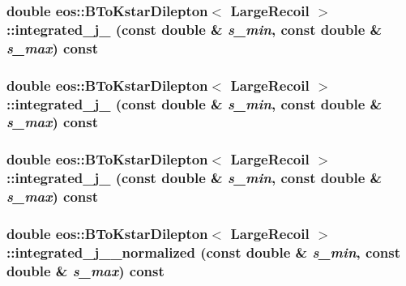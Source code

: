 \hypertarget{classeos_1_1BToKstarDilepton_3_01LargeRecoil_01_4_a1359d703e7bb13a8baea5500e955b8fd}{
\subsubsection[{integrated\_\-j\_\-7}]{\setlength{\rightskip}{0pt plus 5cm}double eos::BToKstarDilepton$<$ {\bf LargeRecoil} $>$::integrated\_\-j\_ (const double \& {\em s\_\-min}, \/  const double \& {\em s\_\-max}) const}}
\label{classeos_1_1BToKstarDilepton_3_01LargeRecoil_01_4_a1359d703e7bb13a8baea5500e955b8fd}
\hypertarget{classeos_1_1BToKstarDilepton_3_01LargeRecoil_01_4_af9105f4298f556dd4a9f449a820dcdd1}{
\subsubsection[{integrated\_\-j\_\-8}]{\setlength{\rightskip}{0pt plus 5cm}double eos::BToKstarDilepton$<$ {\bf LargeRecoil} $>$::integrated\_\-j\_ (const double \& {\em s\_\-min}, \/  const double \& {\em s\_\-max}) const}}
\label{classeos_1_1BToKstarDilepton_3_01LargeRecoil_01_4_af9105f4298f556dd4a9f449a820dcdd1}
\hypertarget{classeos_1_1BToKstarDilepton_3_01LargeRecoil_01_4_afd16f06bd47dcc25e9b63c55f54c8ea6}{
\subsubsection[{integrated\_\-j\_\-9}]{\setlength{\rightskip}{0pt plus 5cm}double eos::BToKstarDilepton$<$ {\bf LargeRecoil} $>$::integrated\_\-j\_ (const double \& {\em s\_\-min}, \/  const double \& {\em s\_\-max}) const}}
\label{classeos_1_1BToKstarDilepton_3_01LargeRecoil_01_4_afd16f06bd47dcc25e9b63c55f54c8ea6}
\hypertarget{classeos_1_1BToKstarDilepton_3_01LargeRecoil_01_4_a22bdeb99bb04ac635496405758ecf0d1}{
\subsubsection[{integrated\_\-j\_\-9\_\-normalized}]{\setlength{\rightskip}{0pt plus 5cm}double eos::BToKstarDilepton$<$ {\bf LargeRecoil} $>$::integrated\_\-j\_\_\-normalized (const double \& {\em s\_\-min}, \/  const double \& {\em s\_\-max}) const}}
